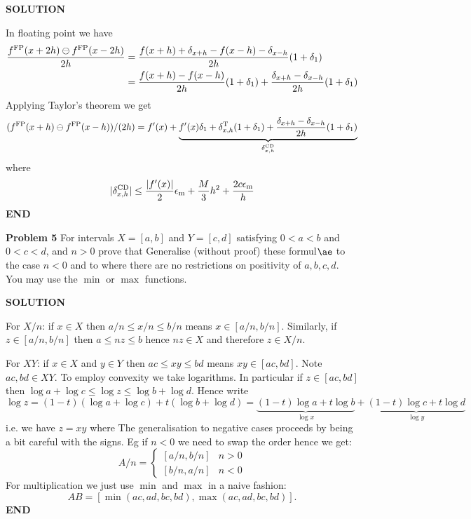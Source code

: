 \documentclass[12pt,a4paper]{article}
\begin{document}
\textbf{SOLUTION}

In floating point we have
\begin{align*}
{f^{\rm FP}(x + 2h) \ensuremath{\ominus} f^{\rm FP}(x-2h) \over 2h} &= {f(x + h) +  \ensuremath{\delta}_{x+h} - f(x-h) - \ensuremath{\delta}_{x-h} \over 2h} (1 + \ensuremath{\delta}_1) \\
&= {f(x+h) - f(x-h) \over 2h} (1 + \ensuremath{\delta}_1) + {\ensuremath{\delta}_{x+h}- \ensuremath{\delta}_{x-h} \over 2h} (1 + \ensuremath{\delta}_1)
\end{align*}
Applying Taylor's theorem we get
\[
(f^{\rm FP}(x + h) \ensuremath{\ominus} f^{\rm FP}(x-h)) / (2h) =
f'(x) + \underbrace{f'(x) \ensuremath{\delta}_1 + \ensuremath{\delta}_{x,h}^{\rm T} (1 + \ensuremath{\delta}_1) + {\ensuremath{\delta}_{x+h}- \ensuremath{\delta}_{x-h} \over 2h} (1 + \ensuremath{\delta}_1)}_{\ensuremath{\delta}_{x,h}^{\rm CD}}
\]
where
\[
|\ensuremath{\delta}_{x,h}^{\rm CD}| \ensuremath{\leq} {|f'(x)| \over 2} \ensuremath{\epsilon}_{\rm m} + {M \over 3} h^2 + {2 c \ensuremath{\epsilon}_{\rm m} \over h}
\]
\textbf{END}

\textbf{Problem 5} For intervals  $X = [a,b]$ and $Y = [c,d]$ satisfying $0 < a < b$ and $0 < c < d$, and $n > 0$ prove that
Generalise (without proof) these formul\ensuremath{\ae} to the case $n < 0$ and to where there are no restrictions on positivity of $a,b,c,d$. You may use the $\min$ or $\max$ functions.

\textbf{SOLUTION}

For $X/n$: if $x \ensuremath{\in} X$ then $a/n \ensuremath{\leq} x/n \ensuremath{\leq} b/n$ means $x \ensuremath{\in} [a/n,b/n]$. Similarly,  if $z \ensuremath{\in} [a/n,b/n]$ then $a \ensuremath{\leq} nz \ensuremath{\leq} b$ hence $nz \ensuremath{\in} X$ and therefore $z \ensuremath{\in} X/n$.

For $XY$: if $x \ensuremath{\in} X$ and $y \ensuremath{\in} Y$ then $ac \ensuremath{\leq} xy \ensuremath{\leq} bd$ means $xy \ensuremath{\in} [ac,bd]$. Note $ac,bd \ensuremath{\in} XY$. To employ convexity we take logarithms. In particular if $z \ensuremath{\in} [ac,bd]$ then $\log a + \log c \ensuremath{\leq} \log z \ensuremath{\leq} \log b + \log d$. Hence write
\[
\log z = (1-t) (\log a + \log c) + t (\log b + \log d) =
        \underbrace{(1-t)\log a + t \log b}_{\log x} + \underbrace{(1-t)\log c + t \log d}_{\log y}
\]
i.e. we have $z = xy$ where
The generalisation to negative cases proceeds by being a bit careful with the signs. Eg if $n < 0$ we need to swap the order hence we get:
\[
A/n =  \begin{cases}
[a/n,b/n] & n > 0  \\
[b/n,a/n] & n < 0 
\end{cases}
\]
For multiplication we just use $\min$ and $\max$ in a naive fashion:
\[
AB = [\min(ac,ad,bc,bd), \max(ac,ad,bc,bd)].
\]
\textbf{END}
\end{document}
